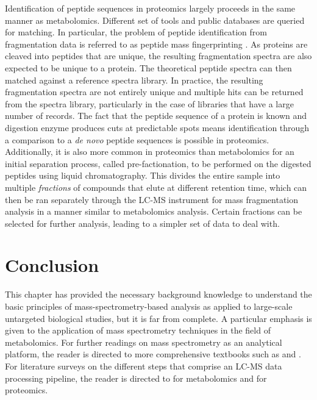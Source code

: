 Identification of peptide sequences in proteomics largely proceeds in the same manner as metabolomics. Different set of tools and public databases are queried for matching. In particular, the problem of peptide identification from fragmentation data is referred to as peptide mass fingerprinting \cite{Sandin2014}. As proteins are cleaved into peptides that are unique, the resulting fragmentation spectra are also expected to be unique to a protein. The theoretical peptide spectra can then matched against a reference spectra library. In practice, the resulting fragmentation spectra are not entirely unique and multiple hits can be returned from the spectra library, particularly in the case of libraries that have a large number of records. The fact that the peptide sequence of a protein is known and digestion enzyme produces cuts at predictable spots means identification through a comparison to a \textit{de novo} peptide sequences is possible in proteomics. Additionally, it is also more common in proteomics than metabolomics for an initial separation process, called pre-factionation, to be performed on the digested peptides using liquid chromatography. This divides the entire sample into multiple \emph{fractions} of compounds that elute at different retention time, which can then be ran separately through the LC-MS instrument for mass fragmentation analysis in a manner similar to metabolomics analysis. Certain fractions can be selected for further analysis, leading to a simpler set of data to deal with.

\section{Conclusion}

This chapter has provided the necessary background knowledge to understand the basic principles of mass-spectrometry-based analysis as applied to large-scale untargeted biological studies, but it is far from complete. A particular emphasis is given to the application of mass spectrometry techniques in the field of metabolomics. For further readings on mass spectrometry as an analytical platform, the reader is directed to more comprehensive textbooks such as \cite{Hoffmann2007} and \cite{gross2006mass}. For literature surveys on the different steps that comprise an LC-MS data processing pipeline, the reader is directed to \cite{Castillo2011,Smith2014,Gika2014,Alonso2015} for metabolomics and \cite{Sandin2014, Megger2013, Smith2014} for proteomics. 

